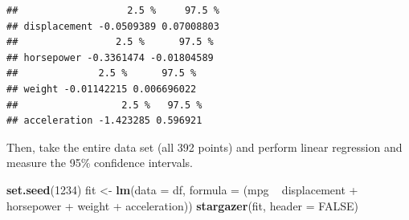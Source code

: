 \documentclass[]{article}
\newenvironment{Shaded}{\begin{snugshade}}{\end{snugshade}}
\newcommand{\KeywordTok}[1]{\textcolor[rgb]{0.13,0.29,0.53}{\textbf{{#1}}}}
\newcommand{\DataTypeTok}[1]{\textcolor[rgb]{0.13,0.29,0.53}{{#1}}}
\newcommand{\DecValTok}[1]{\textcolor[rgb]{0.00,0.00,0.81}{{#1}}}
\newcommand{\StringTok}[1]{\textcolor[rgb]{0.31,0.60,0.02}{{#1}}}
\newcommand{\OtherTok}[1]{\textcolor[rgb]{0.56,0.35,0.01}{{#1}}}
\newcommand{\NormalTok}[1]{{#1}}
\begin{document}
\begin{verbatim}
##                   2.5 %     97.5 %
## displacement -0.0509389 0.07008803
##                 2.5 %      97.5 %
## horsepower -0.3361474 -0.01804589
##              2.5 %      97.5 %
## weight -0.01142215 0.006696022
##                  2.5 %   97.5 %
## acceleration -1.423285 0.596921
\end{verbatim}

Then, take the entire data set (all 392 points) and perform linear
regression and measure the 95\% confidence intervals.

\begin{Shaded}
\begin{Highlighting}[]
\KeywordTok{set.seed}\NormalTok{(}\DecValTok{1234}\NormalTok{)}
\NormalTok{fit <-}\StringTok{ }\KeywordTok{lm}\NormalTok{(}\DataTypeTok{data =} \NormalTok{df, }\DataTypeTok{formula =} \NormalTok{(mpg ~}\StringTok{ }\NormalTok{displacement +}
\StringTok{                                  }\NormalTok{horsepower +}\StringTok{ }\NormalTok{weight +}\StringTok{ }\NormalTok{acceleration))}
\KeywordTok{stargazer}\NormalTok{(fit, }\DataTypeTok{header =} \OtherTok{FALSE}\NormalTok{)}
\end{Highlighting}
\end{Shaded}
\end{document}
